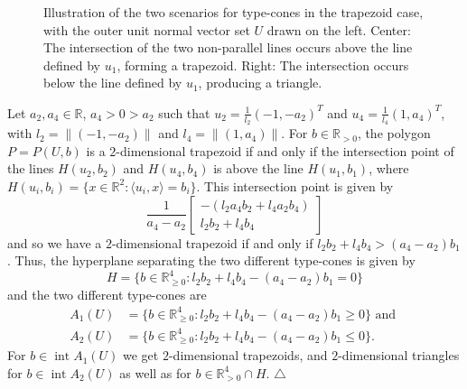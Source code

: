 \documentclass[11pt, a4paper, twoside, reqno]{amsart}
\DeclareMathOperator*{\inter}{int}
\newcommand{\R}{\mathbb{R}}
\theoremstyle{definition}
\theoremstyle{remark}
\numberwithin{equation}{section}
\begin{document}
\begin{figure}[hbt]
    \caption{Illustration of the two scenarios for type-cones in the trapezoid case, with the outer unit normal vector set $U$ drawn on the left. Center: The intersection of the two non-parallel lines occurs above the line defined by $u_1$, forming a trapezoid. Right: The intersection occurs below the line defined by $u_1$, producing a triangle.}
    \label{fig:typeConesTrapezoid}
\end{figure}
Let $a_2, a_4 \in \R$, $a_4 > 0 > a_2$ such that $u_2 =
\frac{1}{l_2}(-1,-a_2)^T$ and $u_4 = \frac{1}{l_4}(1,a_4)^T$, with $l_2 = \| (-1,-a_2) \|$ and $l_4 = \| (1,a_4)
\|$. For  $b \in \R_{>0}$, the polygon $P = P(U,b)$ is a
$2$-dimensional trapezoid if and only if the intersection point of the lines $H(u_2,b_2)$ and $H(u_4,b_4)$ is above the line  $H(u_1,b_1)$, where $H(u_i,b_i)=\{x\in\R^2 : \langle u_i,x\rangle=b_i\}$. This intersection point is given by
\begin{equation}
    \frac{1}{a_4-a_2} \begin{bmatrix}
        -(l_2 a_4 b_2 + l_4 a_2 b_4) \\
        l_2 b_2 + l_4 b_4
    \end{bmatrix}
\end{equation}
and so we have a $2$-dimensional trapezoid if and only if $l_2 b_2 + l_4 b_4 > (a_4 - a_2) b_1$. Thus, the hyperplane separating the two different type-cones is given by \[H= \{ b \in \R_{\geq 0}^4 : l_2 b_2 + l_4 b_4 - (a_4 - a_2) b_1 = 0 \} \]
and the two different type-cones are
\begin{align*}
    A_1(U) & = \{ b \in \R_{\geq 0}^4 : l_2 b_2 + l_4 b_4 - (a_4 - a_2) b_1 \geq 0 \} \text{ and } \\ A_2(U) & = \{ b \in \R_{\geq 0}^4 : l_2 b_2 + l_4 b_4 - (a_4 - a_2) b_1 \leq 0 \}.
\end{align*}
For $b\in \inter A_1(U)$ we get  $2$-dimensional trapezoids, and $2$-dimensional triangles for $b\in  \inter A_2(U)$ as well as for $b\in\R^4_{>0}\cap H$. \hfill$\triangle$
\end{document}
